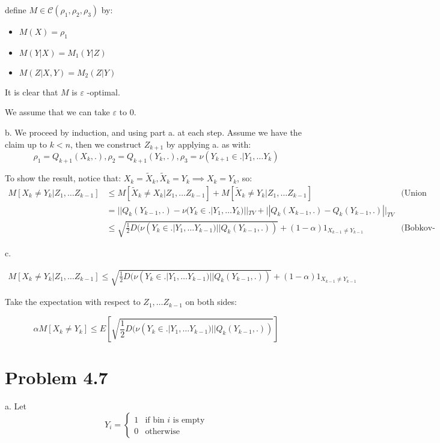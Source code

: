 \documentclass[11pt]{article}
\begin{document}
define \(M \in \mathcal C(\rho_1, \rho_2, \rho_3)\) by:
\begin{itemize}
\item \(M(X) = \rho_1\)
\item \(M(Y | X) = M_1(Y | Z)\)
\item \(M(Z | X, Y) = M_2(Z | Y)\)
\end{itemize}


It is clear that \(M\) is \(\varepsilon\) -optimal.

We assume that we can take \(\varepsilon\) to 0.

b.
We proceed by induction, and using part a. at each step.
Assume we have the claim up to \(k < n\), then we construct \(Z_{k+1}\) by applying a. as with:
$$\rho_1 = Q_{k+1}(X_k, .), \rho_2 = Q_{k+1}(Y_k, .), \rho_3 = \nu(Y_{k+1} \in . | Y_1, \ldots Y_k)$$

To show the result, notice that:
\(X_k = \tilde X_k, \tilde X_k = Y_k \implies X_k = Y_k\), so:
\begin{align*}
M[X_k \ne Y_k | Z_1, \ldots Z_{k-1}]
&\le M[\tilde X_k \ne X_k | Z_1, \ldots Z_{k-1}] + M[\tilde X_k \ne Y_k | Z_1, \ldots Z_{k-1}]
&\text{(Union Bound)}
\\&=  ||Q_k(Y_{k-1}, .) - \nu(Y_k \in .| Y_1, \ldots Y_k)||_{TV} + ||Q_k(X_{k-1}, .) - Q_k(Y_{k-1}, .)||_{TV}
\\&\le \sqrt{\frac12 D(\nu(Y_k \in .| Y_1, \ldots Y_{k-1}) || Q_k(Y_{k-1}, .))} + (1-\alpha)1_{X_{k-1}\ne Y_{k-1}}
& \text{(Bobkov-Gotze)}
\end{align*}

c.

\begin{align*}
M[X_k \ne Y_k | Z_1, \ldots Z_{k-1}]
\le \sqrt{\frac12 D(\nu(Y_k \in .| Y_1, \ldots Y_{k-1}) || Q_k(Y_{k-1}, .))} + (1-\alpha)1_{X_{k-1}\ne Y_{k-1}}
\end{align*}

Take the expectation with respect to \(Z_1, \ldots Z_{k-1}\) on both sides:

$$\alpha M[X_k \ne Y_k] \le E[\sqrt{\frac12 D(\nu(Y_k \in .| Y_1, \ldots Y_{k-1}) || Q_k(Y_{k-1}, .))}]$$




\section{Problem 4.7}
\label{sec:orgheadline5}

a. Let
\[
  Y_i = \left\{\begin{array}{cc}1 &\text{if bin $i$ is empty}\\ 0 & \text{otherwise}\end{array}\right.
  \]
\end{document}
